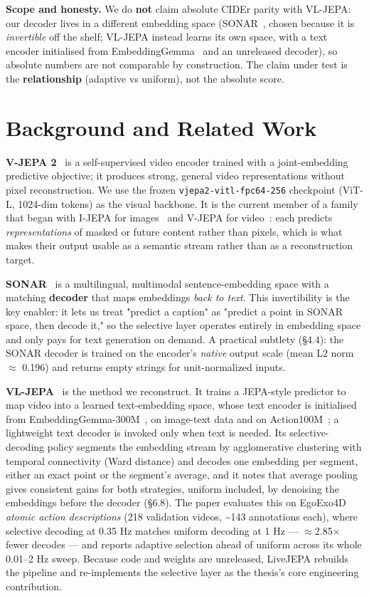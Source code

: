 \textbf{Scope and honesty.} We do \textbf{not} claim absolute CIDEr parity with VL-JEPA: our decoder lives in a different embedding space (SONAR~\cite{sonar2023}, chosen because it is \emph{invertible} off the shelf; VL-JEPA instead learns its own space, with a text encoder initialised from EmbeddingGemma~\cite{embeddinggemma2025} and an unreleased decoder), so absolute numbers are not comparable by construction. The claim under test is the \textbf{relationship} (adaptive vs uniform), not the absolute score.

\medskip

\section{Background and Related Work}

\textbf{V-JEPA 2}~\cite{vjepa2} is a self-supervised video encoder trained with a joint-embedding predictive objective; it produces strong, general video representations without pixel reconstruction. We use the frozen \texttt{vjepa2-vitl-fpc64-256} checkpoint (ViT-L, 1024-dim tokens) as the visual backbone. It is the current member of a family that began with I-JEPA for images~\cite{ijepa2023} and V-JEPA for video~\cite{vjepa2024}: each predicts \emph{representations} of masked or future content rather than pixels, which is what makes their output usable as a semantic stream rather than as a reconstruction target.

\textbf{SONAR}~\cite{sonar2023} is a multilingual, multimodal sentence-embedding space with a matching \textbf{decoder} that maps embeddings \emph{back to text}. This invertibility is the key enabler: it lets us treat "predict a caption" as "predict a point in SONAR space, then decode it," so the selective layer operates entirely in embedding space and only pays for text generation on demand. A practical subtlety (\S4.4): the SONAR decoder is trained on the encoder's \emph{native} output scale (mean L2 norm $\approx$ 0.196) and returns empty strings for unit-normalized inputs.

\textbf{VL-JEPA}~\cite{vljepa2025} is the method we reconstruct. It trains a JEPA-style predictor to map video into a learned text-embedding space, whose text encoder is initialised from EmbeddingGemma-300M~\cite{embeddinggemma2025}, on image-text data and on Action100M~\cite{action100m2026}; a lightweight text decoder is invoked only when text is needed. Its selective-decoding policy segments the embedding stream by agglomerative clustering with temporal connectivity (Ward distance) and decodes one embedding per segment, either an exact point or the segment's average, and it notes that average pooling gives consistent gains for both strategies, uniform included, by denoising the embeddings before the decoder (\S6.8). The paper evaluates this on EgoExo4D \emph{atomic action descriptions} (218 validation videos, \textasciitilde{}143 annotations each), where selective decoding at 0.35 Hz matches uniform decoding at 1 Hz --- $\approx$2.85$\times$ fewer decodes --- and reports adaptive selection ahead of uniform across its whole 0.01--2 Hz sweep. Because code and weights are unreleased, LiveJEPA rebuilds the pipeline and re-implements the selective layer as the thesis's core engineering contribution.

